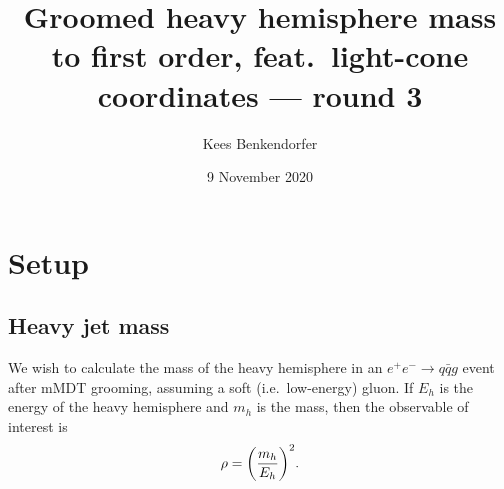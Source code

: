 \documentclass[11pt,twoside,reqno]{amsart}
\title{Groomed heavy hemisphere mass to first order, feat.\ light-cone coordinates --- round 3}
\author{Kees Benkendorfer}
\date{9 November 2020}
\theoremstyle{plain}
\theoremstyle{remark}
\theoremstyle{definition}
\theoremstyle{remark}
\theoremstyle{definition}
\theoremstyle{definition}
\begin{document}
\maketitle

\section{Setup}

\subsection{Heavy jet mass}

	We wish to calculate the mass of the heavy hemisphere in an $e^+ e^- \to q\bar q g$ event after mMDT grooming, assuming a soft (i.e.\ low-energy) gluon. If $E_h$ is the energy of the heavy hemisphere and $m_h$ is the mass, then the observable of interest is \cite{larkoski_improving_2020}
	\begin{equation}
		\rho = \qty(\frac{m_h}{E_h})^2.
	\end{equation}
\end{document}
